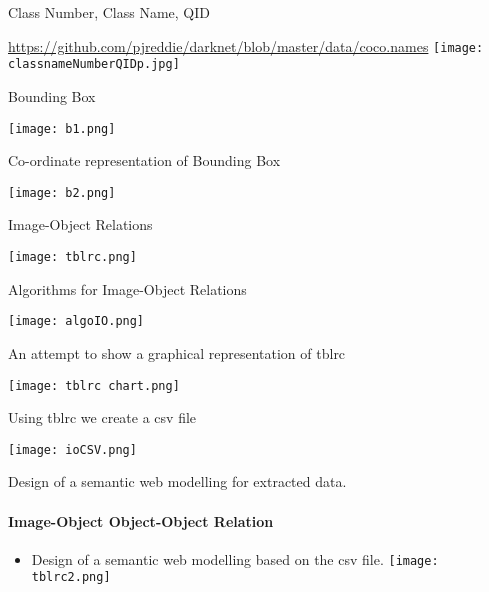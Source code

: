 \documentclass{beamer}
\begin{document}
\begin{frame}{Class Number, Class Name, QID}

\begin{itemize}
\url{https://github.com/pjreddie/darknet/blob/master/data/coco.names}
\texttt{[image: classnameNumberQIDp.jpg]}
\end{itemize}
\end{frame}


\begin{frame}{Bounding Box}


\texttt{[image: b1.png]}

\end{frame}


\begin{frame}{Co-ordinate representation of Bounding Box}


\texttt{[image: b2.png]}

\end{frame}



\begin{frame}{Image-Object Relations}


\texttt{[image: tblrc.png]}

\end{frame}


\begin{frame}{Algorithms for Image-Object Relations}


\texttt{[image: algoIO.png]}

\end{frame}

\begin{frame}{An attempt to show a graphical representation of tblrc}


\texttt{[image: tblrc chart.png]}

\end{frame}

\begin{frame}{Using tblrc we create a csv file}


\texttt{[image: ioCSV.png]}

\end{frame}

\begin{frame}{Design of a semantic web modelling for extracted data.}
\framesubtitle{Image-Object Object-Object Relation}
\begin{itemize}
\item Design of a semantic web modelling based on the csv file.
\texttt{[image: tblrc2.png]}
\end{itemize}
\end{frame}
\end{document}
